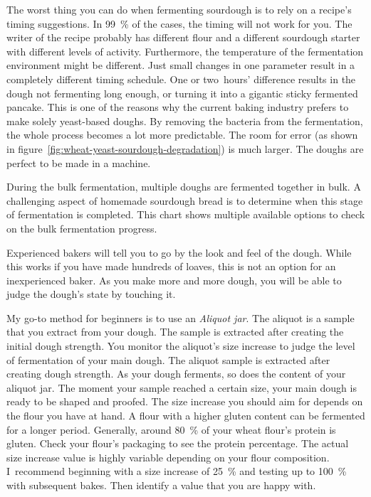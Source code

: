 The worst thing you can do when fermenting sourdough
is to rely on a recipe's timing suggestions. In \qty{99}{\percent}
of the cases, the timing will not work for you. The writer
of the recipe probably has different flour and a different
sourdough starter with different levels of activity. Furthermore,
the temperature of the fermentation environment might be
different. Just small changes in one parameter result
in a completely different timing schedule. One or two~hours'
difference results in the dough not fermenting long enough, or
turning it into a gigantic sticky fermented pancake. This
is one of the reasons why the current baking industry prefers
to make solely yeast-based doughs. By removing the bacteria
from the fermentation, the whole process becomes a lot more
predictable. The room for error (as shown in figure~\ref{fig:wheat-yeast-sourdough-degradation})
is much larger. The doughs are perfect to be made in a
machine.

\begin{flowchart}[!htb]
\begin{center}
  
  \caption[Process to check the bulk fermentation]{During the bulk
      fermentation, multiple doughs are fermented together in bulk.  A
      challenging aspect of homemade sourdough bread is to determine when this
      stage of fermentation is completed. This chart shows multiple available
      options to check on the bulk fermentation progress.}%
  \label{fig:bulk-fermentation}
\end{center}
\end{flowchart}

Experienced bakers will tell you to go by the look and feel of
the dough. While this works if you have made hundreds of loaves,
this is not an option for an inexperienced baker. As
you make more and more dough, you will be able to judge
the dough's state by touching it.

My go-to method for beginners is to use an \emph{Aliquot jar}.
The aliquot is a sample that you extract from your dough. The
sample is extracted after creating the initial dough strength.
You monitor the aliquot's size increase to judge the
level of fermentation of your main dough. The aliquot
sample is extracted after creating dough strength. As your
dough ferments, so does the content of your aliquot jar. The moment your
sample reached a certain size, your main dough is ready
to be shaped and proofed. The size increase you should
aim for depends on the flour you have at hand. A flour
with a higher gluten content can be fermented for a
longer period. Generally, around \qty{80}{\percent}
of your wheat flour's protein is gluten. Check your flour's
packaging to see the protein percentage. The actual size increase
value is highly variable depending on your flour composition.
I~recommend beginning with a size increase of \qty{25}{\percent} and testing
up to \qty{100}{\percent} with subsequent bakes. Then identify a value
that you are happy with.

